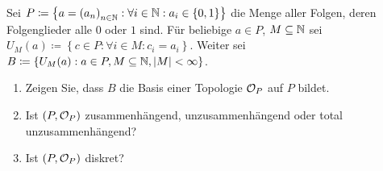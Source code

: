 \begin{assignment}
  Sei \( P \coloneqq \left \{ a = {(a_n)}_{n \in \mathbb{N}} : \forall i \in \mathbb{N} : a_i \in \left \{ 0,1 \right \} \right \} \) die Menge aller Folgen, deren Folgenglieder alle \( 0 \) oder \( 1 \) sind. Für beliebige \( a \in P \), \( M \subseteq \mathbb{N} \) sei \( U_M(a) \coloneqq \left \{ c \in P : \forall i \in M : c_i = a_i \right \} \). Weiter sei \( B \coloneqq \left \{ U_M(a) : a \in P, M \subseteq \mathbb{N}, \left \vert M \right \vert < \infty \right \} \).
  \begin{enumerate}[label= (\alph*)]
    \item Zeigen Sie, dass \(B\) die Basis einer Topologie \(\mathcal{O}_P\) auf \(P\) bildet.
    \item Ist \( (P, \mathcal{O}_P) \) zusammenhängend, unzusammenhängend oder total unzusammenhängend?
    \item Ist \( (P, \mathcal{O}_P) \) diskret?
  \end{enumerate}
\end{assignment}
